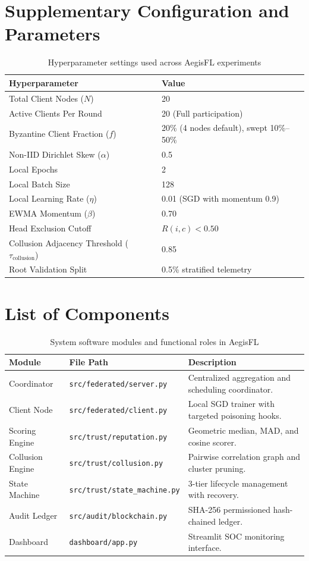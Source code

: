 \documentclass[12pt,a4paper]{report}
\begin{document}
\chapter{Supplementary Configuration and Parameters}
\begin{table}[H]
\centering
\caption{Hyperparameter settings used across AegisFL experiments}
\label{tab:params}
\begin{tabularx}{\textwidth}{lX}
\toprule
\textbf{Hyperparameter} & \textbf{Value} \\
\midrule
Total Client Nodes ($N$) & 20 \\
Active Clients Per Round & 20 (Full participation) \\
Byzantine Client Fraction ($f$) & 20\% (4 nodes default), swept 10\%--50\% \\
Non-IID Dirichlet Skew ($\alpha$) & 0.5 \\
Local Epochs & 2 \\
Local Batch Size & 128 \\
Local Learning Rate ($\eta$) & 0.01 (SGD with momentum 0.9) \\
EWMA Momentum ($\beta$) & 0.70 \\
Head Exclusion Cutoff & $R(i, c) < 0.50$ \\
Collusion Adjacency Threshold ($\tau_{\text{collusion}}$) & 0.85 \\
Root Validation Split & 0.5\% stratified telemetry \\
\bottomrule
\end{tabularx}
\end{table}

\chapter{List of Components}
\begin{table}[H]
\centering
\caption{System software modules and functional roles in AegisFL}
\label{tab:comp_list}
\begin{tabularx}{\textwidth}{llX}
\toprule
\textbf{Module} & \textbf{File Path} & \textbf{Description} \\
\midrule
Coordinator & \texttt{src/federated/server.py} & Centralized aggregation and scheduling coordinator. \\
Client Node & \texttt{src/federated/client.py} & Local SGD trainer with targeted poisoning hooks. \\
Scoring Engine & \texttt{src/trust/reputation.py} & Geometric median, MAD, and cosine scorer. \\
Collusion Engine & \texttt{src/trust/collusion.py} & Pairwise correlation graph and cluster pruning. \\
State Machine & \texttt{src/trust/state\_machine.py} & 3-tier lifecycle management with recovery. \\
Audit Ledger & \texttt{src/audit/blockchain.py} & SHA-256 permissioned hash-chained ledger. \\
Dashboard & \texttt{dashboard/app.py} & Streamlit SOC monitoring interface. \\
\bottomrule
\end{tabularx}
\end{table}
\end{document}
